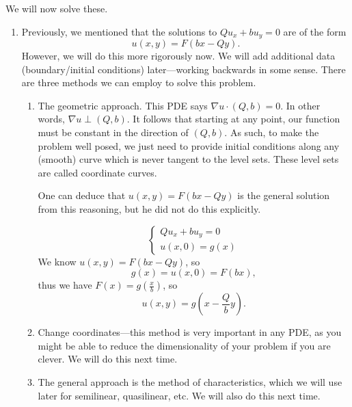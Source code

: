 We will now solve these.
\begin{enumerate}

	\item Previously, we mentioned that the solutions to \( Qu_{x} + bu_{y} = 0 \) are of the form
		\[ u(x, y) = F(bx - Qy). \]
		However, we will do this more rigorously now. We will add additional data (boundary/initial conditions) later---working backwards in some sense. There are three methods we can employ to solve this problem.
		\begin{enumerate}
		
			\item The geometric approach. This PDE says \( \nabla u \cdot (Q, b) = 0 \). In other words, \( \nabla u \perp (Q, b) \). It follows that starting at any point, our function must be constant in the direction of \( (Q, b) \). As such, to make the problem well posed, we just need to provide initial conditions along any (smooth) curve which is never tangent to the level sets. These level sets are called coordinate curves.

				One can deduce that \( u(x, y) = F(bx - Qy) \) is the general solution from this reasoning, but he did not do this explicitly.
				\begin{example}
					\[ \left\{ 
							\begin{array}{c}
						Q u_{x} + b u_{y} = 0 \\
						u(x, 0) = g(x)
					\end{array}\right. \]
					We know \( u(x, y) = F(bx - Qy) \), so
					\[ g(x) = u(x, 0) = F(bx), \]
					thus we have \( F(x) = g \left( \frac{x}{b} \right) \), so
					\[ u(x, y) = g \left( x - \frac{Q}{b} y \right). \]
				\end{example}
			\item Change coordinates---this method is very important in any PDE, as you might be able to reduce the dimensionality of your problem if you are clever. We will do this next time.
			\item The general approach is the method of characteristics, which we will use later for semilinear, quasilinear, etc. We will also do this next time.
		
		\end{enumerate}

\end{enumerate}
